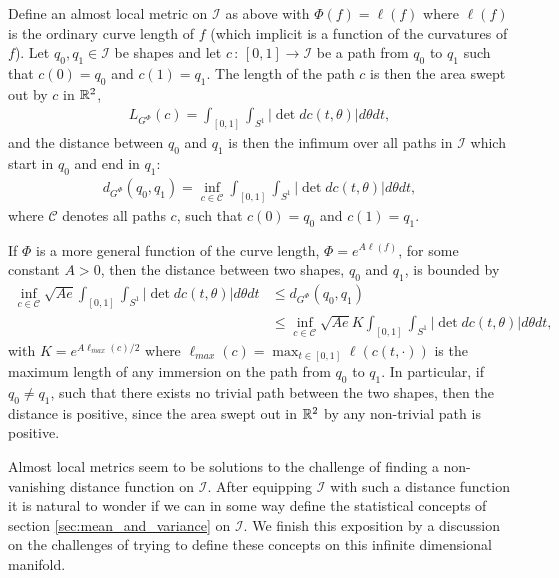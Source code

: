 \begin{example}
Define an almost local metric on $\mathcal{I}$ as above with $\Phi(f) = \ell(f)$ where $\ell(f)$ is the ordinary curve length of $f$ (which implicit is a function of the curvatures of $f$). Let $q_0, q_1 \in \mathcal{I}$ be shapes and let $c \, : \, [0,1] \rightarrow \mathcal{I}$ be a path from $q_0$ to $q_1$ such that $c(0) = q_0$ and $c(1) = q_1$. The length of the path $c$ is then the area swept out by $c$ in $\mathbb{R}^2$,
\begin{align*}
L_{G^\Phi}(c) = \int_{[0,1]} \int_{S^1} \left| \det dc(t, \theta) \right| d\theta dt,
\end{align*}
and the distance between $q_0$ and $q_1$ is then the infimum over all paths in $\mathcal{I}$ which start in $q_0$ and end in $q_1$:
\begin{align*}
d_{G^\Phi}(q_0, q_1) = \inf_{c\in\mathcal{C}} \int_{[0,1]} \int_{S^1} \left| \det dc(t, \theta) \right| d\theta dt,
\end{align*}
where $\mathcal{C}$ denotes all paths $c$, such that $c(0) =q_0$ and $c(1) =q_1$. \\[0.2 cm]
\end{example}
\begin{example}
If $\Phi$ is a more general function of the curve length, $\Phi = e^{A \ell (f)}$, for some constant $A > 0$, then the distance between two shapes, $q_0$ and $q_1$, is bounded by
\begin{align*}
\inf_{c\in\mathcal{C}} \sqrt{A e} \int_{[0,1]} \int_{S^1} \left| \det dc(t, \theta) \right| d\theta dt & \leq d_{G^\Phi}(q_0, q_1) \\ 
& \leq \inf_{c\in\mathcal{C}} \sqrt{A e} K \int_{[0,1]} \int_{S^1} \left| \det dc(t, \theta) \right| d\theta dt,
\end{align*}
with $K = e^{A \ell_{max}(c) / 2}$ where $\ell_{max} (c) = \max_{t \in [0,1]} \ell (c(t, \cdot))$ is the maximum length of any immersion on the path from $q_0$ to $q_1$. In particular, if $q_0 \neq q_1$, such that there exists no trivial path between the two shapes, then the distance is positive, since the area swept out in $\mathbb{R}^2$ by any non-trivial path is positive. 
\end{example}
Almost local metrics seem to be solutions to the challenge of finding a non-vanishing distance function on $\mathcal{I}$. After equipping $\mathcal{I}$ with such a distance function it is natural to wonder if we can in some way define the statistical concepts of section \ref{sec:mean_and_variance} on $\mathcal{I}$. We finish this exposition by a discussion on the challenges of trying to define these concepts on this infinite dimensional manifold.




